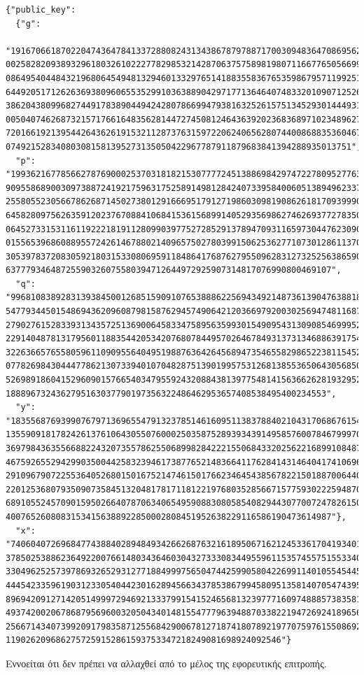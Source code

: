 \documentclass{tufte-handout}
\begin{document}
\begin{verbatim}
{"public_key": 
  {"g":
    "19167066187022047436478413372880824313438678797887170030948364708695623454
0025828209389329618032610222778298532142870637575898198071166776505669965855352
0864954044843219680645494813294601332976514188355836765359867957119925177411997
6449205171262636938096065535299103638890429717713646407483320109071252653916730
3862043809968274491783890449424280786699479381632526157513452930144493178834329
0050407462687321571766164835628144727450812464363920236836897102348962763254627
7201661921395442643626191532112873763159722062406562807440086883536046720111922
074921528340803081581395273135050422967787911879683841394288935013751",
  "p":
"199362167785662787690002537031818215307777245138869842974722780952776364560876
9095586890030973887241921759631752589149812842407339584006051389496233759826432
2558055230566786268714502738012916669517912719860309819086261817093999047426105
6458280975626359120237670884106841536156899140529356986274626937727835086818069
0645273315311611922218191128099039775272852913789470931165973044762309050045934
0155653968608895572426146788021409657502780399150625362771073012861137005134355
3053978372083059218031533080695911848641768762795509628312732525638659045052391
63777934648725590326075580394712644972925907314817076990800469107",
  "q":
"996810838928313938450012685159091076538886225694349214873613904763881822804384
5477934450154869436209608798158762945749064212036697920030256947481168799132161
2790276152833931343572513690064583347589563599301549095431309085469995237130528
2291404878131795601188354420534207680784495702646784931373134688639175434090345
3226366576558059611090955640495198876364264568947354655829865223811545250229670
0778269843044477862130733940107048287513901995753126813855365064305685025671776
5269891860415296090157665403479559243208843813977548141563662628193295225261958
1888967324362795163037790197356322486462953657408538495400234553",
  "y":
"183556876939907679713696554791323785146160951138378840210431706867615408524495
1355909181782426137610643055076000250358752893934391495857600784679997070334260
3697984363556688224320735578625506899828422215506843320256221689910848754470396
4675926552942990350044258323946173877652148366411762841431464041741069600997733
2910967907225536405268015016752147461501766234645438567822150188700644023694376
2201253680793509073584513204817817118122197680352856671577593022259487049596052
6891055245709015950266407870634065495908830805854082944307700724782615029588841
40076526080831534156388922850002808451952638229116586190473614987"},
  "x":
"740604072696847743884028948493426626876321618950671621245336170419340125980364
3785025388623649220076614803436460304327333083449559611535745575155334084284099
3304962525739786932652931277188499975650474425990580422699114010554544541416019
4445423359619031233054044230162894566343785386799458095135814070547439532451695
8969420912714205149997294692133379915415246568132397771609748885738358150692386
4937420020678687956960032050434014815547779639488703382219472692418965649559869
2566714340739920917983587125568429006781271874180789219770759761550869249288071
1190262096862757259152861593753347218249081698924092546"}
\end{verbatim}

\noindent Εννοείται ότι δεν πρέπει να αλλαχθεί από το μέλος της εφορευτικής
επιτροπής.
\end{document}
